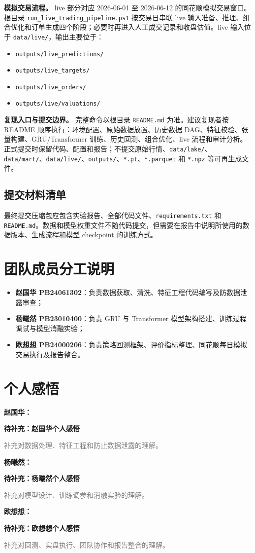 \documentclass[12pt,a4paper,cn,bibtex]{elegantpaper}
\newcommand{\placeholder}[2]{
    \par\medskip
    \noindent\textbf{待补充：#1}\par
    \noindent\textcolor{gray}{#2}
    \par\medskip
}
\newcommand{\codepath}[1]{\nolinkurl{#1}}
\begin{document}
\textbf{模拟交易流程。} live 部分对应 2026-06-01 至 2026-06-12 的同花顺模拟交易窗口。根目录 \codepath{run_live_trading_pipeline.ps1} 按交易日串联 live 输入准备、推理、组合优化和订单生成四个阶段；必要时再进入人工成交记录和收盘估值。live 输入位于 \codepath{data/live/}，输出主要位于：
\begin{itemize}
    \item \codepath{outputs/live_predictions/}
    \item \codepath{outputs/live_targets/}
    \item \codepath{outputs/live_orders/}
    \item \codepath{outputs/live/valuations/}
\end{itemize}

\textbf{复现入口与提交边界。} 完整命令以根目录 \codepath{README.md} 为准。建议复现者按 README 顺序执行：环境配置、原始数据放置、历史数据 DAG、特征校验、张量构建、GRU/Transformer 训练、历史回测、组合优化、live 流程和审计分析。正式提交时保留代码、配置和报告；不提交原始行情、\codepath{data/lake/}、\codepath{data/mart/}、\codepath{data/live/}、\codepath{outputs/}、\codepath{*.pt}、\codepath{*.parquet} 和 \codepath{*.npz} 等可再生成文件。

\subsection{提交材料清单}
最终提交压缩包应包含实验报告、全部代码文件、\texttt{requirements.txt} 和 \texttt{README.md}。数据和模型权重文件不随代码提交，但需要在报告中说明所使用的数据版本、生成流程和模型 checkpoint 的训练方式。

\section*{团队成员分工说明}
\begin{itemize}
    \item \textbf{赵国华 PB24061302}：负责数据获取、清洗、特征工程代码编写及防数据泄露审查；
    \item \textbf{杨曦然 PB23010400}：负责 GRU 与 Transformer 模型架构搭建、训练过程调试与模型消融实验；
    \item \textbf{欧想想 PB24000206}：负责策略回测框架、评价指标整理、同花顺每日模拟交易执行及报告整合。
\end{itemize}

\section*{个人感悟}
\textbf{赵国华：} \placeholder{赵国华个人感悟}{补充对数据处理、特征工程和防止数据泄露的理解。}

\textbf{杨曦然：} \placeholder{杨曦然个人感悟}{补充对模型设计、训练调参和消融实验的理解。}

\textbf{欧想想：} \placeholder{欧想想个人感悟}{补充对回测、实盘执行、团队协作和报告整合的理解。}

\nocite{vaswani2017,cho2014}
\printbibliography
\end{document}

